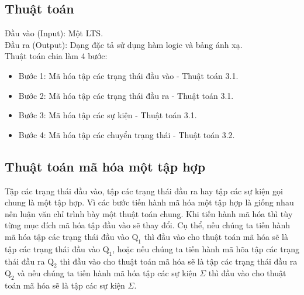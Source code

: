 \documentclass[a4paper,13pt,oneside,openany]{book}
\newenvironment{megaalgorithm}[1][htb]
{\renewcommand{\algorithmcfname}{Thuật toán}%
	\begin{algorithm}[#1]%
}{\end{algorithm}}
\begin{document}
\begin{flushleft}
		\section{Thuật toán}
		Đầu vào (Input): Một LTS.\\
		Đầu ra (Output): Dạng đặc tả sử dụng hàm logic và bảng ánh xạ.\\
		Thuật toán chia làm 4 bước:
		
		\begin{itemize}
			\item Bước 1: Mã hóa tập các trạng thái đầu vào - Thuật toán 3.1.
			\item Bước 2: Mã hóa tập các trạng thái đầu ra - Thuật toán 3.1.
			\item Bước 3: Mã hóa tập các sự kiện - Thuật toán 3.1.
			\item Bước 4: Mã hóa tập các chuyển trạng thái - Thuật toán 3.2.
		\end{itemize}
		
		\subsection{Thuật toán mã hóa một tập hợp}
		Tập các trạng thái đầu vào, tập các trạng thái đầu ra hay tập các sự kiện gọi chung là một tập hợp. Vì các bước tiến hành mã hóa một tập hợp là giống nhau nên luận văn chỉ trình bày một thuật toán chung. Khi tiến hành mã hóa thì tùy từng mục đích mã hóa tập đầu vào sẽ thay đổi. Cụ thể, nếu chúng ta tiến hành mã hóa tập các trạng thái đầu vào $\textrm{Q}_1$ thì đầu vào cho thuật toán mã hóa sẽ là tập các trạng thái đầu vào $\textrm{Q}_1$, hoặc nếu chúng ta tiến hành mã hõa tập các trạng thái đầu ra $\textrm{Q}_2$ thì đầu vào cho thuật toán mã hóa sẽ là tập các trạng thái đầu ra $\textrm{Q}_2$ và nếu chúng ta tiến hành mã hóa tập các sự kiện $\Sigma$ thì đầu vào cho thuật toán mã hóa sẽ là tập các sự kiện $\Sigma$.\\
		\begin{megaalgorithm}[H]
			\SetAlgoLined
			\DontPrintSemicolon
				

\end{megaalgorithm}
\end{flushleft}
\end{document}

